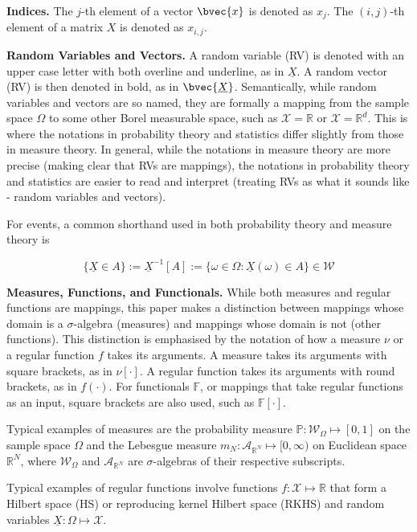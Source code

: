 \documentclass[twoside]{article} \usepackage{aistats2017}
\newcommand{\rv}[1]{\underline{#1}}
\begin{document}
	\textbf{Indices.} The $j$-th element of a vector $\bvec{x}$ is denoted as $x_{j}$. The $(i, j)$-th element of a matrix $X$ is denoted as $x_{i, j}$.
	
	\textbf{Random Variables and Vectors.} A random variable (RV) is denoted with an upper case letter with both overline and underline, as in $\rv{X}$. A random vector (RV) is then denoted in bold, as in $\bvec{\rv{X}}$. Semantically, while random variables and vectors are so named, they are formally a mapping from the sample space $\Omega$ to some other Borel measurable space, such as $\mathcal{X} = \mathbb{R}$ or $\mathcal{X} = \mathbb{R}^{d}$. This is where the notations in probability theory and statistics differ slightly from those in measure theory. In general, while the notations in measure theory are more precise (making clear that RVs are mappings), the notations in probability theory and statistics are easier to read and interpret (treating RVs as what it sounds like - random variables and vectors).
	
	For events, a common shorthand used in both probability theory and measure theory is
	
	\begin{equation}
		\{\rv{X} \in A\} := \rv{X}^{-1}[A] := \{\omega \in \Omega : \rv{X}(\omega) \in A\} \in \mathcal{W}
	\end{equation}
	
	\textbf{Measures, Functions, and Functionals.} While both measures and regular functions are mappings, this paper makes a distinction between mappings whose domain is a $\sigma$-algebra (measures) and mappings whose domain is not (other functions). This distinction is emphasised by the notation of how a measure $\nu$ or a regular function $f$ takes its arguments. A measure takes its arguments with square brackets, as in $\nu[\cdot]$. A regular function takes its arguments with round brackets, as in $f(\cdot)$. For functionals $\mathbb{F}$, or mappings that take regular functions as an input, square brackets are also used, such as $\mathbb{F}[\cdot]$.
	
	Typical examples of measures are the probability measure $\mathbb{P} : \mathcal{W}_{\Omega} \mapsto [0, 1]$ on the sample space $\Omega$ and the Lebesgue measure $m_{N} : \mathcal{A}_{\mathbb{R}^{N}} \mapsto [0, \infty)$ on Euclidean space $\mathbb{R}^{N}$, where $\mathcal{W}_{\Omega}$ and $\mathcal{A}_{\mathbb{R}^{N}}$ are $\sigma$-algebras of their respective subscripts.
	
	Typical examples of regular functions involve functions $f : \mathcal{X} \mapsto \mathbb{R}$ that form a Hilbert space (HS) or reproducing kernel Hilbert space (RKHS) and random variables $\rv{X} : \Omega \mapsto \mathcal{X}$.
	
\end{document}
